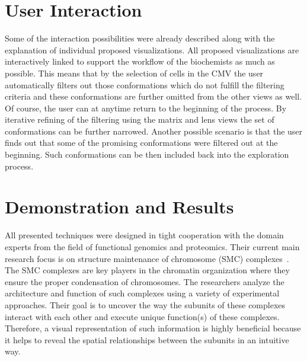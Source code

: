 \documentclass[journal]{vgtc}                %
\begin{document}
\section{User Interaction}
Some of the interaction possibilities were already described along with the explanation of individual proposed visualizations.
All proposed visualizations are interactively linked to support the workflow of the biochemists as much as possible.
This means that by the selection of cells in the CMV the user automatically filters out those conformations which do not fulfill the filtering criteria and these conformations are further omitted from the other views as well.
Of course, the user can at anytime return to the beginning of the process. 
By iterative refining of the filtering using the matrix and lens views the set of conformations can be further narrowed.
Another possible scenario is that the user finds out that some of the promising conformations were filtered out at the beginning.
Such conformations can be then included back into the exploration process.

\section{Demonstration and Results}
All presented techniques were designed in tight cooperation with the domain experts from the field of functional genomics and proteomics.
Their current main research focus is on structure maintenance of chromosome (SMC) complexes~\cite{Hudson2011,Guerineau2012,Palecek2015}. 
The SMC complexes are key players in the chromatin organization where they ensure the proper condensation of chromosomes. 
The researchers analyze the architecture and function of such complexes using a variety of experimental approaches. 
Their goal is to uncover the way the subunits of these complexes interact with each other and execute unique function(s) of these complexes. 
Therefore, a visual representation of such information is highly beneficial because it helps to reveal the spatial relationships between the subunits in an intuitive way.
\end{document}
